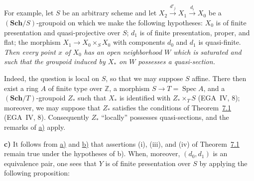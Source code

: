 
For example, let \(S\) be an arbitrary scheme and let
\(X_2\xrightarrow{d'_j}X_1\xrightarrow{d_i}X_0\) be a
\((\mathbf{Sch}/S)\)-groupoid on which we make the following hypotheses:
\(X_0\) is of finite presentation and quasi-projective over \(S\); \(d_1\) is of
finite presentation, proper, and flat; the morphism
\(X_1\to X_0\times_SX_0\) with components \(d_0\) and \(d_1\) is quasi-finite.
\emph{Then every point \(x\) of \(X_0\) has an open neighborhood \(W\) which is
saturated and such that the groupoid induced by \(X_\ast\) on \(W\)
possesses a quasi-section.}

Indeed, the question is local on \(S\), so that we may suppose \(S\)
affine. There then exist a ring \(A\) of finite type over \(\mathbb Z\), a
morphism \(S\to T=\operatorname{Spec}A\), and a \((\mathbf{Sch}/T)\)-groupoid
\(Z_\ast\) such that \(X_\ast\) is identified with \(Z_\ast\times_TS\)
(EGA~IV, 8); moreover, we may suppose that \(Z_\ast\) satisfies the
conditions of Theorem~\hyperref[thm:sga3-V-7.1]{7.1} (EGA~IV, 8). Consequently \(Z_\ast\)
``locally'' possesses quasi-sections, and the remarks of \hyperref[par:sga3-V-9-a]{a)} apply.

\medskip
\noindent\textbf{c)}\quad
It follows from \hyperref[par:sga3-V-9-a]{a)} and \hyperref[par:sga3-V-9-b]{b)} that assertions (i), (iii), and (iv) of
Theorem~\hyperref[thm:sga3-V-7.1]{7.1} remain true under the hypotheses of b). When, moreover,
\((d_0,d_1)\) is an equivalence pair, one sees that \(Y\) is of finite
presentation over \(S\) by applying the following proposition:

